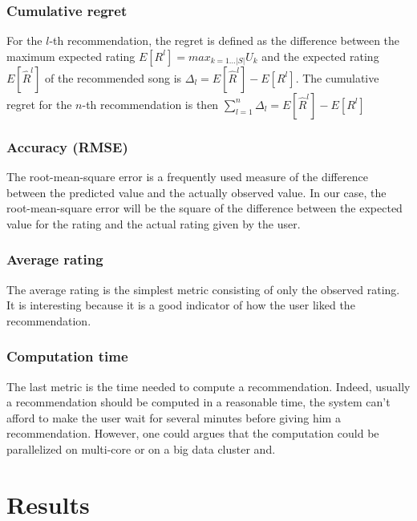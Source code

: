 \documentclass[letterpaper]{article}
\begin{document}
\subsubsection{Cumulative regret}

For the $l$-th recommendation, the regret is defined as the difference between the maximum expected rating $ E[R^{l}] = max_{k=1...|S|} U_{k} $  and the expected rating $E[\hat R^{l}]$ of the recommended song is  $\Delta_{l} = E[\hat{R} ^{l}] - E[R^{l}]$. The cumulative regret for the $n$-th recommendation is then $ \sum_{l=1}^{n} \Delta_{l} = E[\hat{R} ^{l}] - E[R^{l}]$

\subsubsection{Accuracy (RMSE)}

The root-mean-square error is a frequently used measure of the difference between the predicted value and the actually observed value. In our case, the root-mean-square error will be the square of the difference between the expected value for the rating and the actual rating given by the user.

\subsubsection{Average rating}

The average rating is the simplest metric consisting of only the observed rating. It is interesting because it is a good indicator of how the user liked the recommendation.

\subsubsection{Computation time}

The last metric is the time needed to compute a recommendation. Indeed, usually a recommendation should be computed in a reasonable time, the system can't afford to make the user wait for several minutes before giving him a recommendation. However, one could argues that the computation could be parallelized on multi-core or on a big data cluster and.  


\section{Results} \label{results}

\end{document}
